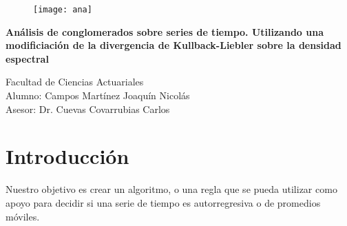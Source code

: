 \documentclass[12pt,oneside]{book}
\begin{document}
\begin{titlepage}
\vspace{3cm}
\begin{figure}[ht!]
\centering
\texttt{[image: ana]}
\end{figure}
\hspace{.6\textwidth}
\vspace{2cm}

\begin{center}
{\LARGE \textbf{An\'alisis de conglomerados sobre series de tiempo. Utilizando una modificiaci\'on de la divergencia de Kullback-Liebler sobre la densidad espectral}}\break
	\vspace{2cm} 

		{\Large Facultad de Ciencias Actuariales}\\
		{\Large Alumno: Campos Mart\'inez Joaqu\'in Nicol\'as}\\
		{\Large Asesor: Dr. Cuevas Covarrubias Carlos}
		\end{center}

		\end{titlepage}
\tableofcontents %
\setcounter{page}{0}

\chapter*{Introducci\'on} 


Nuestro objetivo es crear un algoritmo, o una regla que se pueda utilizar como apoyo para decidir si una serie de tiempo es autorregresiva o de promedios m\'oviles.\\
\end{document}
